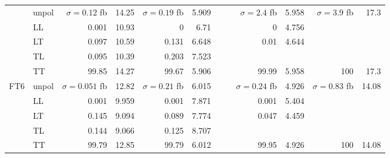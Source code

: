 \begin{table}[h]
{\begin{tabular}{llrrrrrrrrrr}
 & unpol & $\sigma = \num{0.12}$ fb & \num{14.25} & $\sigma = \num{0.19}$ fb & \num{5.909} &  &  & $\sigma = \num{2.4}$ fb & \num{5.958} & $\sigma = \num{3.9}$ fb & \num{17.3} \\
 & LL & \num{0.001} & \num{10.93} & \num{0} & \num{6.71} &  &  & \num{0} & \num{4.756} &  &  \\
 & LT & \num{0.097} & \num{10.59} & \num{0.131} & \num{6.648} &  &  & \num{0.01} & \num{4.644} &  &  \\
 & TL & \num{0.095} & \num{10.39} & \num{0.203} & \num{7.523} &  &  &  &  &  &  \\
 & TT & \num{99.85} & \num{14.27} & \num{99.67} & \num{5.906} &  &  & \num{99.99} & \num{5.958} & \num{100} & \num{17.3} \\
\midrule
\multirow{5}{*}{FT6}
 & unpol & $\sigma = \num{0.051}$ fb & \num{12.82} & $\sigma = \num{0.21}$ fb & \num{6.015} &  &  & $\sigma = \num{0.24}$ fb & \num{4.926} & $\sigma = \num{0.83}$ fb & \num{14.08} \\
 & LL & \num{0.001} & \num{9.959} & \num{0.001} & \num{7.871} &  &  & \num{0.001} & \num{5.404} &  &  \\
 & LT & \num{0.145} & \num{9.094} & \num{0.089} & \num{7.774} &  &  & \num{0.047} & \num{4.459} &  &  \\
 & TL & \num{0.144} & \num{9.066} & \num{0.125} & \num{8.707} &  &  &  &  &  &  \\
 & TT & \num{99.79} & \num{12.85} & \num{99.79} & \num{6.012} &  &  & \num{99.95} & \num{4.926} & \num{100} & \num{14.08} \\
\bottomrule
\end{tabular}
}%
\end{table}